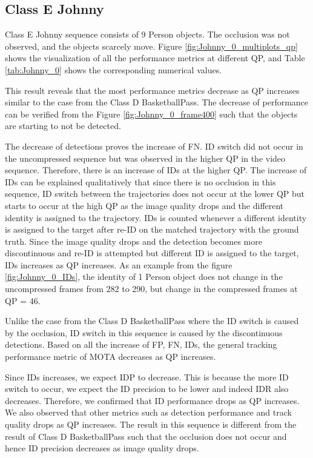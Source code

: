 \subsection{Class E Johnny}
Class E Johnny sequence consists of 9 Person objects. The occlusion was not observed, and the objects scarcely move. Figure \ref{fig:Johnny_0_multiplots_qp} shows the visualization of all the performance metrics at different QP, and Table \ref{tab:Johnny_0} shows the corresponding numerical values. 


This result reveals that the most performance metrics decrease as QP increases similar to the case from the Class D BasketballPass. The decrease of performance can be verified from the Figure \ref{fig:Johnny_0_frame400} such that the objects are starting to not be detected.

The decrease of detections proves the increase of FN. ID switch did not occur in the uncompressed sequence but was observed in the higher QP in the video sequence. Therefore, there is an increase of IDs at the higher QP. The increase of IDs can be explained qualitatively that since there is no occlusion in this sequence, ID switch between the trajectories does not occur at the lower QP but starts to occur at the high QP as the image quality drops and the different identity is assigned to the trajectory. IDs is counted whenever a different identity is assigned to the target after re-ID on the matched trajectory with the ground truth. Since the image quality drops and the detection becomes more discontinuous and re-ID is attempted but different ID is assigned to the target, IDs increases as QP increases. As an example from the figure \ref{fig:Johnny_0_IDs}, the identity of 1 Person object does not change in the uncompressed frames from 282 to 290, but change in the compressed frames at QP = 46.

Unlike the case from the Class D BasketballPass where the ID switch is caused by the occlusion, ID switch in this sequence is caused by the discontinuous detections. Based on all the increase of FP, FN, IDs, the general tracking performance metric of MOTA decreases as QP increases.

Since IDs increases, we expect IDP to decrease. This is because the more ID switch to occur, we expect the ID precision to be lower and indeed IDR also decreases. Therefore, we confirmed that ID performance drops as QP increases. We also observed that other metrics such as detection performance and track quality drops as QP increases. The result in this sequence is different from the result of Class D BasketballPass such that the occlusion does not occur and hence ID precision decreases as image quality drops.

